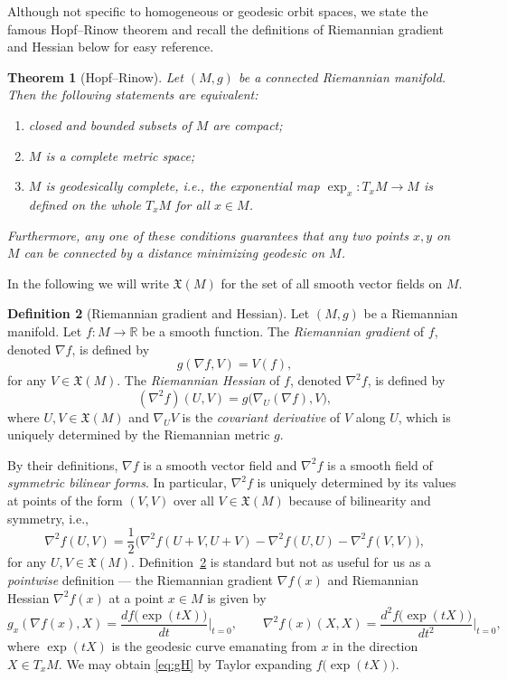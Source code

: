 \documentclass[11pt,reqno]{amsart}%
\newtheorem{theorem}{Theorem}[section]
\theoremstyle{definition}
\newtheorem{definition}[theorem]{Definition}
\theoremstyle{remark}
\begin{document}
Although not specific to homogeneous or geodesic orbit spaces, we state the famous Hopf--Rinow theorem \cite[Theorem $1.8$]{CE2008} and recall the definitions of Riemannian gradient and Hessian \cite{Helgason1978,KN1969,Boothby1975} below for easy reference.
\begin{theorem}[Hopf--Rinow]\label{thm:Hopf--Rinow}
Let $(M,g)$ be a connected Riemannian manifold. Then the following statements are equivalent:
\begin{enumerate}[\upshape (i)]
\item closed and bounded subsets of $M$ are compact;
\item $M$ is a complete metric space;
\item $M$ is geodesically complete, i.e., the exponential map $\exp_x: T_xM \to M$ is defined on the whole $T_xM$ for all $x\in M$.
\end{enumerate}
Furthermore, any one of these conditions guarantees that any two points $x,y$ on $M$ can be connected by a distance minimizing geodesic on $M$.
\end{theorem}
In the following we will write $ \mathfrak{X}(M)$ for the set of all smooth vector fields on $M$.
\begin{definition}[Riemannian gradient and Hessian]\label{def:gH}
Let $(M,g)$ be a Riemannian manifold. Let $f:M \to \mathbb{R}$ be a smooth function. The \emph{Riemannian gradient} of $f$, denoted $\nabla f$, is defined by
\[
g(\nabla f,V) = V(f),
\]
for any $V \in \mathfrak{X}(M)$. The \emph{Riemannian Hessian}  of $f$, denoted $\nabla^2 f$, is defined by
\[
(\nabla^2 f)(U,V) = g\bigl(\nabla_U(\nabla f), V\bigr),
\]
where $U,V \in \mathfrak{X}(M)$ and $\nabla_U V$ is the \emph{covariant derivative} of $V$ along $U$, which is uniquely determined by the Riemannian metric $g$.
\end{definition}

By their definitions, $\nabla f$ is a smooth vector field and $\nabla^2 f$ is a smooth field of \emph{symmetric bilinear forms}. In particular, $\nabla^2 f$ is uniquely determined by its values at points of the form $(V,V)$ over all $V\in \mathfrak{X}(M)$ because of bilinearity and symmetry, i.e.,
\begin{equation}\label{eq:polar}
\nabla^2f(U,V) = \frac{1}{2} \bigl(\nabla^2f (U + V, U + V)  -\nabla^2f(U,U) - \nabla^2f(V,V) \bigr),
\end{equation}
for any $U,V  \in \mathfrak{X}(M)$. Definition~\ref{def:gH} is standard but not as useful for us as a \emph{pointwise} definition --- the Riemannian gradient $\nabla f(x)$ and Riemannian Hessian $\nabla^2f(x)$ at  a point  $x\in M$ is given by
\begin{equation}\label{eq:gH}
g_x(\nabla f(x),X) = \frac{d f\bigl(\exp(tX)\bigr)}{dt}\Bigr|_{t=0},\qquad 
\nabla^2 f(x) (X,X) =\frac{d^2 f\bigl(\exp(tX)\bigr)}{dt^2}\Bigr|_{t=0},
\end{equation}
where $\exp(tX)$ is the geodesic curve emanating from $x$ in the direction $X \in T_x M$. We may obtain \eqref{eq:gH} by Taylor expanding $f\bigl(\exp(tX)\bigr)$.
\end{document}
